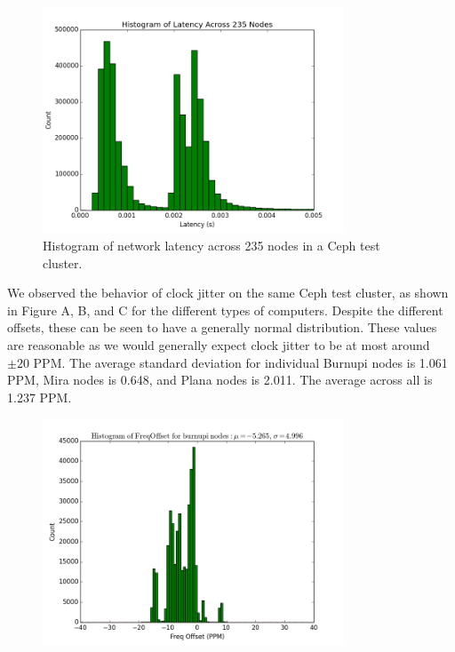 \begin{figure}[h]
  \centering
  \caption{Histogram of network latency across 235 nodes in a Ceph test cluster.} 
  \label{fig:latency-hist}
  \includegraphics[width=0.8\textwidth]{latency-hist.png}
\end{figure}


We observed the behavior of clock jitter on the same Ceph test
cluster, as shown in Figure A, B, and C for the different types of
computers. Despite the different offsets, these can be seen to have a
generally normal distribution. These values are reasonable as we would
generally expect clock jitter to be at most around $\pm 20$ PPM. The average
standard deviation for individual Burnupi nodes is 1.061 PPM, Mira
nodes is 0.648, and Plana nodes is 2.011. The average across all is
1.237 PPM.


\begin{figure}[h]
  \centering
  \includegraphics[width=0.8\textwidth]{burnupi-freq-offset.png}
\end{figure}

